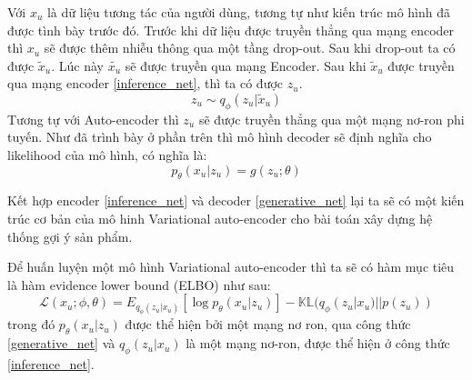     Với $x_u$ là dữ liệu tương tác của người dùng, tương tự như kiến trúc mô hình đã được tình bày trước đó.
    Trước khi dữ liệu được truyền thẳng qua mạng encoder thì $x_u$ sẽ được thêm nhiễu thông qua một tầng drop-out. 
    Sau khi drop-out ta có được $\tilde{x}_u$. 
    Lúc này $\tilde{x_u}$ sẽ được truyền qua mạng Encoder. 
    Sau khi $\tilde{x}_u$ được truyền qua mạng encoder \ref{inference_net}, thì ta có được $z_u$.
    \begin{equation}
        \label{sampling_zu}
        z_u \sim q_\phi(z_u|\tilde{x}_u)
    \end{equation}
    Tương tự với Auto-encoder thì $z_u$ sẽ được truyền thẳng qua một mạng nơ-ron phi tuyến. 
    Như đã trình bày ở phần trên thì mô hình decoder sẽ định nghĩa cho likelihood của mô hình, có nghĩa là:
    \begin{equation}
        \label{generative_net}
        p_\theta(x_u|z_u) = g(z_u;\theta)
    \end{equation}

    Kết hợp encoder \ref{inference_net} và decoder \ref{generative_net} lại ta sẽ có một kiến trúc cơ bản của mô hinh Variational auto-encoder cho bài toán xây dựng hệ thống gợi ý sản phẩm.

    Để huấn luyện một mô hình Variational auto-encoder thì ta sẽ có hàm mục tiêu là hàm evidence lower bound (ELBO) như sau:
    \begin{equation}
        \label{elbo_mvae}
        \mathcal{L}(x_u;\phi,\theta) = E_{q_\phi(z_u|x_u)}[\log p_\theta(x_u|z_u)] - \mathbb{KL}(q_\phi(z_u|x_u) || p(z_u))
    \end{equation}
    trong đó $p_\theta(x_u|z_u)$ được thể hiện bởi một mạng nơ ron, qua công thức \ref{generative_net} và $q_\phi(z_u|x_u)$ là một mạng nơ-ron, được thể hiện ở công thức \ref{inference_net}.

